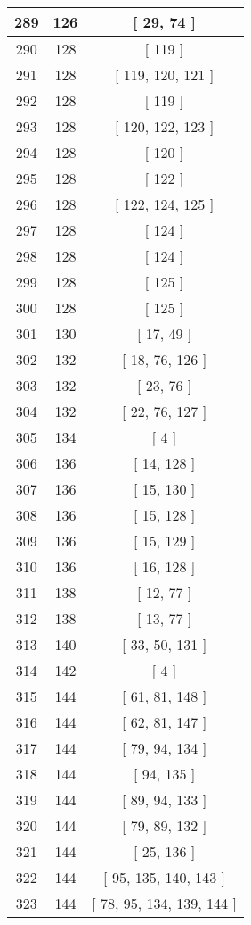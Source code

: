 \begin{center}
\begin{longtable}[H]{|| c c c ||}
\hline
289 & 126 & [ 29, 74 ] \\ 
\hline
290 & 128 & [ 119 ] \\ 
\hline
291 & 128 & [ 119, 120, 121 ] \\ 
\hline
292 & 128 & [ 119 ] \\ 
\hline
293 & 128 & [ 120, 122, 123 ] \\ 
\hline
294 & 128 & [ 120 ] \\ 
\hline
295 & 128 & [ 122 ] \\ 
\hline
296 & 128 & [ 122, 124, 125 ] \\ 
\hline
297 & 128 & [ 124 ] \\ 
\hline
298 & 128 & [ 124 ] \\ 
\hline
299 & 128 & [ 125 ] \\ 
\hline
300 & 128 & [ 125 ] \\ 
\hline
301 & 130 & [ 17, 49 ] \\ 
\hline
302 & 132 & [ 18, 76, 126 ] \\ 
\hline
303 & 132 & [ 23, 76 ] \\ 
\hline
304 & 132 & [ 22, 76, 127 ] \\ 
\hline
305 & 134 & [ 4 ] \\ 
\hline
306 & 136 & [ 14, 128 ] \\ 
\hline
307 & 136 & [ 15, 130 ] \\ 
\hline
308 & 136 & [ 15, 128 ] \\ 
\hline
309 & 136 & [ 15, 129 ] \\ 
\hline
310 & 136 & [ 16, 128 ] \\ 
\hline
311 & 138 & [ 12, 77 ] \\ 
\hline
312 & 138 & [ 13, 77 ] \\ 
\hline
313 & 140 & [ 33, 50, 131 ] \\ 
\hline
314 & 142 & [ 4 ] \\ 
\hline
315 & 144 & [ 61, 81, 148 ] \\ 
\hline
316 & 144 & [ 62, 81, 147 ] \\ 
\hline
317 & 144 & [ 79, 94, 134 ] \\ 
\hline
318 & 144 & [ 94, 135 ] \\ 
\hline
319 & 144 & [ 89, 94, 133 ] \\ 
\hline
320 & 144 & [ 79, 89, 132 ] \\ 
\hline
321 & 144 & [ 25, 136 ] \\ 
\hline
322 & 144 & [ 95, 135, 140, 143 ] \\ 
\hline
323 & 144 & [ 78, 95, 134, 139, 144 ] \\ 

\end{longtable}
\end{center}
